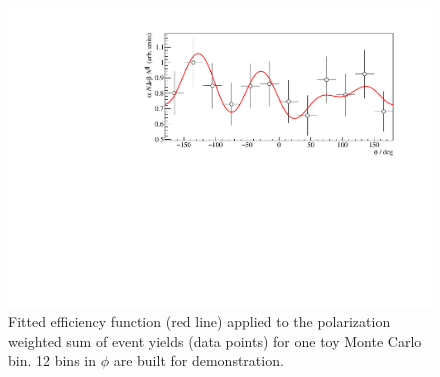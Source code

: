 \begin{figure}[htbp]
	\centering
	\includegraphics[width=\linewidth]{../RooFit/plots/toyMC_eff_unbinned_fit.pdf}
	\caption{Fitted efficiency function (red line) applied to the polarization weighted sum of event yields (data points) for one toy Monte Carlo bin. 12 bins in $\phi$ are built for demonstration.}
	\label{fig:toyMCeff}
\end{figure}
\newpage
